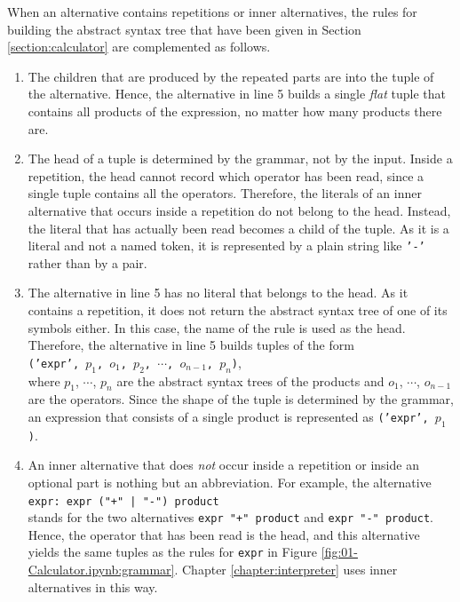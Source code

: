 When an alternative contains repetitions or inner alternatives, the rules for building the abstract syntax
tree that have been given in Section \ref{section:calculator} are complemented as follows.
\begin{enumerate}
\item The children that are produced by the repeated parts are 
      into the tuple of the alternative.  Hence, the alternative in line 5 builds a single \emph{flat} tuple
      that contains all products of the expression, no matter how many products there are.
\item The head of a tuple is determined by the grammar, not by the input.  Inside a repetition, the head
      cannot record which operator has been read, since a single tuple contains all the operators.
      Therefore, the literals of an inner alternative that occurs inside a repetition do not belong to the
      head.  Instead, the literal that has actually been read becomes a child of the tuple.  As it is a literal
      and not a named token, it is represented by a plain string like \texttt{'-'} rather than by a pair.
\item The alternative in line 5 has no literal that belongs to the head.  As it contains a repetition, it does
      not return the abstract syntax tree of one of its symbols either.  In this case, the name of the rule is
      used as the head.  Therefore, the alternative in line 5 builds tuples of the form
      \\[0.2cm]
      \hspace*{1.3cm}
      \texttt{('expr', $p_1$, $o_1$, $p_2$, $\cdots$, $o_{n-1}$, $p_n$)},
      \\[0.2cm]
      where $p_1$, $\cdots$, $p_n$ are the abstract syntax trees of the products and $o_1$, $\cdots$,
      $o_{n-1}$ are the operators.  Since the shape of the tuple is determined by the grammar, an expression
      that consists of a single product is represented as \texttt{('expr', $p_1$)}.
\item An inner alternative that does \emph{not} occur inside a repetition or inside an optional part is
      nothing but an abbreviation.  For example, the alternative
      \\[0.2cm]
      \hspace*{1.3cm}
      \verb!expr: expr ("+" | "-") product!
      \\[0.2cm]
      stands for the two alternatives \texttt{expr "+" product} and \texttt{expr "-" product}.  Hence, the
      operator that has been read is the head, and this alternative yields the same tuples as the rules for
      \texttt{expr} in Figure \ref{fig:01-Calculator.ipynb:grammar}.  Chapter \ref{chapter:interpreter} uses
      inner alternatives in this way.
\end{enumerate}

